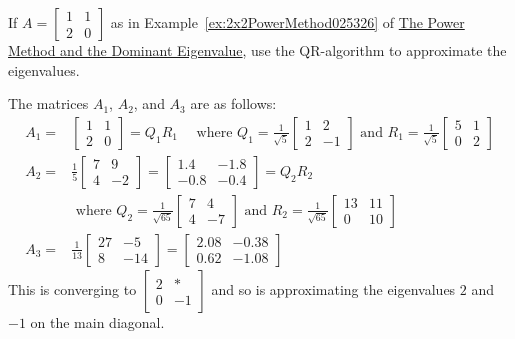 \documentclass{ximera}
\begin{document}
\begin{example}\label{QR-algortihm-2x2-025425}
If $A = \left[ \begin{array}{rr}
1 & 1 \\
2 & 0
\end{array}\right]$ as in Example~\ref{ex:2x2PowerMethod025326} of \href{}{The Power Method and the Dominant Eigenvalue}, use the QR-algorithm to approximate the eigenvalues.

\begin{explanation}
  The matrices $A_{1}$, $A_{2}$, and $A_{3}$ are as follows:
\begin{align*}
A_{1} = & \left[ \begin{array}{rr}
1 & 1 \\
2 & 0
\end{array}\right] = Q_{1}R_{1} \quad \mbox{ where } Q_{1} = \frac{1}{\sqrt{5}}\left[ \begin{array}{rr}
1 & 2 \\
2 & -1
\end{array}\right] \mbox{ and } R_{1} =  \frac{1}{\sqrt{5}}\left[ \begin{array}{rr}
5 & 1 \\
0 & 2
\end{array}\right] \\
A_{2} = & \frac{1}{5}\left[ \begin{array}{rr}
7 & 9 \\
4 & -2
\end{array}\right] = \left[ \begin{array}{rr}
1.4 & -1.8 \\
-0.8 & -0.4
\end{array}\right]= Q_{2}R_{2} \\
&\mbox{ where } Q_{2} = \frac{1}{\sqrt{65}}\left[ \begin{array}{rr}
7 & 4 \\
4 & -7
\end{array}\right] \mbox{ and } R_{2} =  \frac{1}{\sqrt{65}}\left[ \begin{array}{rr}
13 & 11 \\
0 & 10
\end{array}\right] \\
A_{3} = &\frac{1}{13}\left[ \begin{array}{rr}
27 & -5 \\
8 & -14
\end{array}\right] = \left[ \begin{array}{rr}
2.08 & -0.38 \\
0.62 & -1.08
\end{array}\right]
\end{align*}
This is converging to $\left[ \begin{array}{rr}
2 & \ast \\
0 & -1
\end{array}\right]$ and so is approximating the eigenvalues $2$ and $-1$ on the main diagonal.
\end{explanation}
\end{example}
\end{document}
